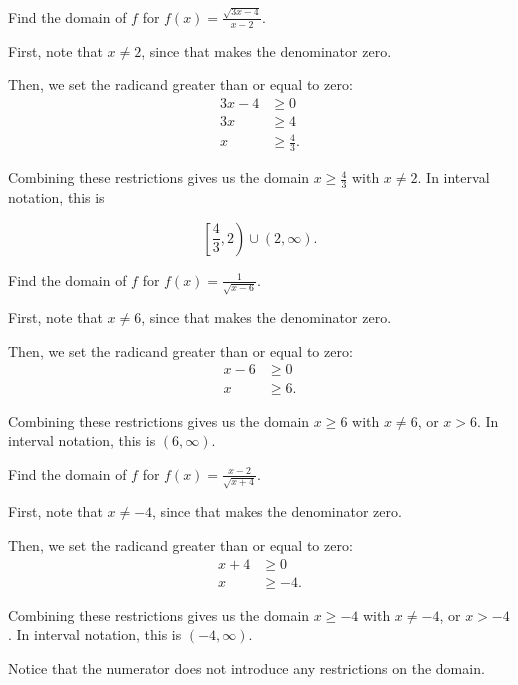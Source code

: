 \documentclass{ximera}
\begin{document}
\begin{example}
Find the domain of $f$ for $f(x) = \frac{\sqrt{3x - 4}}{x - 2}$.
		\begin{explanation}
			\begin{expandable}
First, note that $x \ne 2$, since that makes the denominator zero.

Then, we set the radicand greater than or equal to zero: \begin{align*}3x-4&\ge 0 \\ 3x & \ge 4 \\ x & \ge \frac{4}{3}. \end{align*}

Combining these restrictions gives us the domain $x \ge \frac{4}{3}$ with $x \ne 2$. In interval notation, this is

$$\left[\frac{4}{3}, 2\right) \cup (2, \infty).$$
			\end{expandable}
		\end{explanation}
\end{example}
\begin{example}
Find the domain of $f$ for $f(x) = \frac{1}{\sqrt{x - 6}}$.
		\begin{explanation}
			\begin{expandable}

First, note that $x \ne 6$, since that makes the denominator zero.

Then, we set the radicand greater than or equal to zero: \begin{align*}x-6&\ge 0 \\ x & \ge 6. \end{align*}

Combining these restrictions gives us the domain $x \ge 6$ with $x \ne 6$, or $x > 6$. In interval notation, this is $(6, \infty)$.
			\end{expandable}
		\end{explanation}
\end{example}
\begin{example}
Find the domain of $f$ for $f(x) = \frac{x - 2}{\sqrt{x + 4}}$.
		\begin{explanation}
			\begin{expandable}
First, note that $x \ne -4$, since that makes the denominator zero.

Then, we set the radicand greater than or equal to zero: \begin{align*}x + 4&\ge 0 \\ x & \ge -4. \end{align*}

Combining these restrictions gives us the domain $x \ge -4$ with $x \ne -4$, or $x > -4$. In interval notation, this is $(-4, \infty)$.

Notice that the numerator does not introduce any restrictions on the domain. 
			\end{expandable}
		\end{explanation}
\end{example}
\end{document}
